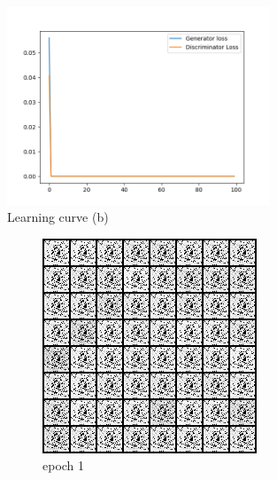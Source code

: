 \documentclass[a4paper]{article}
\theoremstyle{definition}
\newenvironment{soln}{
	\leavevmode\color{blue}\ignorespaces
}{}
\begin{document}
\begin{enumerate} [label=(\alph*)]
\begin{soln}
		      \begin{figure}[H]
			      \centering
			      \includegraphics[width=0.7\textwidth]{img/q1_2/loss.png}
			      \caption*{Learning curve (b)}
		      \end{figure}
		      \begin{figure}[H]
			      \centering
			      \begin{subfigure}[b]{0.3\textwidth}
				      \centering
				      \includegraphics[width=\textwidth]{img/q1_2/gen_img1.png}
				      \caption{epoch 1}
			      \end{subfigure}
			      \hfill
			      \begin{subfigure}[b]{0.3\textwidth}
				      \centering

\end{subfigure}
\end{figure}
\end{soln}
\end{enumerate}
\end{document}
